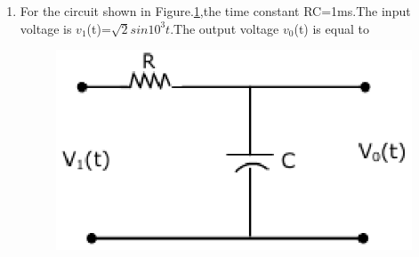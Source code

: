 \documentclass[journal,12pt,twocolumn]{IEEEtran}
\begin{document}
\begin{enumerate}
\item For the circuit shown in Figure.\ref{fig53},the time constant RC=1ms.The input voltage is $v_{1}$(t)=$\sqrt{2} sin 10^{3} t$.The output voltage $v_{0}$(t) is equal to
\begin{enumerate}
\setlength\itemsep{2em}
\begin{figure}[!h]
\begin{center}
\includegraphics[scale=0.7]{./figs/fig53.eps}
\caption{}
\label{fig53}
\end{center}
\end{figure}
\end{enumerate}


\end{enumerate}
\end{document}
